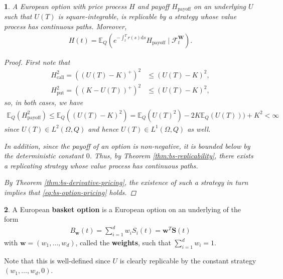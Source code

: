 \documentclass[english]{article}
\numberwithin{equation}{section}
\numberwithin{figure}{section}
\theoremstyle{bolddescit}
\newtheorem{theorem}{\protect\theoremname}[section]
\theoremstyle{definition}
\newtheorem{definition}[theorem]{\protect\definitionname}
\theoremstyle{definition}
\theoremstyle{plain}
\theoremstyle{plain}
\theoremstyle{bolddesc}
\theoremstyle{plain}
\theoremstyle{remark}
\providecommand{\definitionname}{Definition}
\providecommand{\theoremname}{Theorem}
\begin{document}
\begin{theorem}\label{thm:bs-option-pricing}
  A European option with price process $H$ and payoff $H_\text{payoff}$ on an underlying $U$ such that $U(T)$ is square-integrable, is replicable by a strategy whose value process has continuous paths. Moreover,
  \begin{align}\label{eq:bs-option-pricing}
    H(t) = \mathbb{E}_Q\left(e^{-\int_t^T r(s) \mathrm{d}s} H_\text{payoff} \mid \mathcal{F}^\mathbf{W}_t\right).
  \end{align}

  \begin{proof}
    First note that
    \begin{align*}
      H_\text{call}^2 = ((U(T) - K)^+)^2 &\le (U(T) - K)^2,\\
      H_\text{put}^2 = ((K - U(T))^+)^2 &\le (U(T) - K)^2,
    \end{align*}
    so, in both cases, we have
    \begin{align*}
      \mathbb{E}_Q(H_\text{payoff}^2)
      \le \mathbb{E}_Q((U(T) - K)^2)
      = \mathbb{E}_Q(U(T)^2) - 2K\mathbb{E}_Q(U(T))) + K^2
      < \infty
    \end{align*}
    since $U(T) \in L^2(\Omega, Q)$ and hence $U(T) \in L^1(\Omega, Q)$ as well.

    In addition, since the payoff of an option is non-negative, it is bounded below by the deterministic constant $0$. Thus, by Theorem \ref{thm:bs-replicability}, there exists a replicating strategy whose value process has continuous paths.

    By Theorem \ref{thm:bs-derivative-pricing}, the existence of such a strategy in turn implies that \eqref{eq:bs-option-pricing} holds.
  \end{proof}
\end{theorem}

\begin{definition}
  A European \textbf{basket option} is a European option on an underlying of the form
  \begin{align*}
    B_\mathbf{w}(t) = \sum_{i=1}^{d} w_i S_i(t) = \mathbf{w}^T \mathbf{S}(t)
  \end{align*}
  with $\mathbf{w} = (w_1, \ldots, w_d)$, called the \textbf{weights}, such that $\sum_{i=1}^{d} w_i = 1$.
\end{definition}

Note that this is well-defined since $U$ is clearly replicable by the constant strategy $(w_1, \ldots, w_d, 0)$.
\end{document}
